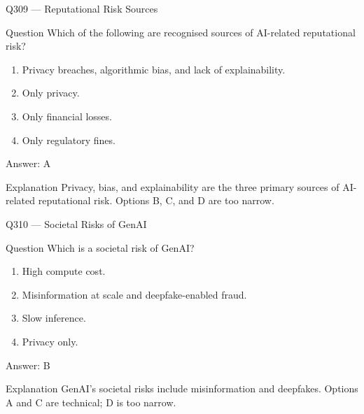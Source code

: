 \documentclass[aspectratio=169,8pt]{beamer}
\begin{document}
\begin{frame}{Q309 --- Reputational Risk Sources}
	\begin{block}{Question}
		Which of the following are recognised sources of AI-related reputational risk?
		\begin{enumerate}
			\item Privacy breaches, algorithmic bias, and lack of explainability.
			\item Only privacy.
			\item Only financial losses.
			\item Only regulatory fines.
	\end{enumerate}  \end{block}
	\begin{exampleblock}{Answer: A}\end{exampleblock}
	\begin{block}{Explanation}
		Privacy, bias, and explainability are the three primary sources of AI-related reputational risk. Options B, C, and D are too narrow.
	\end{block}
\end{frame}

\begin{frame}{Q310 --- Societal Risks of GenAI}
	\begin{block}{Question}
		Which is a societal risk of GenAI?
		\begin{enumerate}
			\item High compute cost.
			\item Misinformation at scale and deepfake-enabled fraud.
			\item Slow inference.
			\item Privacy only.
	\end{enumerate}  \end{block}
	\begin{exampleblock}{Answer: B}\end{exampleblock}
	\begin{block}{Explanation}
		GenAI's societal risks include misinformation and deepfakes. Options A and C are technical; D is too narrow.
	\end{block}
\end{frame}
\end{document}
